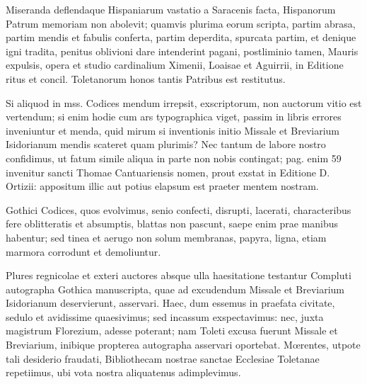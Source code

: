 \documentclass[letter,11pt]{book}
\begin{document}
\par Miseranda deflendaque Hispaniarum vastatio a Saracenis facta, Hispanorum Patrum memoriam non abolevit; quamvis plurima eorum scripta, partim abrasa, partim mendis et fabulis conferta, partim deperdita, spurcata partim, et denique igni tradita, penitus oblivioni dare intenderint pagani, postliminio tamen, Mauris expulsis, opera et studio cardinalium Ximenii, Loaisae et Aguirrii, in Editione ritus et concil. Toletanorum honos tantis Patribus est restitutus.

Si aliquod in mss. Codices mendum irrepsit, exscriptorum, non auctorum vitio est vertendum; si enim hodie cum ars typographica viget, passim in libris errores inveniuntur et menda, quid mirum si inventionis initio Missale et Breviarium Isidorianum mendis scateret quam plurimis? Nec tantum de labore nostro confidimus, ut fatum simile aliqua in parte non nobis contingat; pag. enim 59 invenitur sancti Thomae Cantuariensis nomen, prout exstat in Editione D. Ortizii: appositum illic aut potius elapsum est praeter mentem nostram.

Gothici Codices, quos evolvimus, senio confecti, disrupti, lacerati, characteribus fere oblitteratis et absumptis, blattas non pascunt, saepe enim prae manibus habentur; sed tinea et aerugo non solum membranas, papyra, ligna, etiam marmora corrodunt et demoliuntur.

Plures regnicolae et exteri auctores absque ulla haesitatione testantur Compluti autographa Gothica manuscripta, quae ad excudendum Missale et Breviarium Isidorianum deservierunt, asservari. Haec, dum essemus in praefata civitate, sedulo et avidissime quaesivimus; sed incassum exspectavimus: nec, juxta magistrum Florezium, adesse poterant; nam Toleti excusa fuerunt Missale et Breviarium, inibique propterea autographa asservari oportebat. Mœrentes, utpote tali desiderio fraudati, Bibliothecam nostrae sanctae Ecclesiae Toletanae repetiimus, ubi vota nostra aliquatenus adimplevimus.
\end{document}
